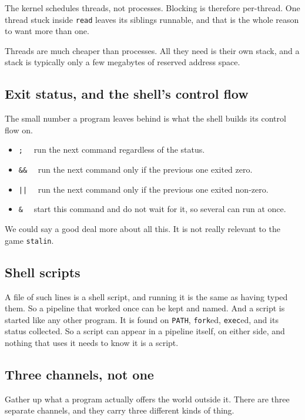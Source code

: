 \documentclass[11pt,a4paper]{article}
\begin{document}
The kernel schedules threads, not processes. Blocking is therefore per-thread. One thread stuck
inside \texttt{read} leaves its siblings runnable, and that is the whole reason to want more than
one.

Threads are much cheaper than processes. All they need is their own stack, and a stack is
typically only a few megabytes of reserved address space.


\subsection{Exit status, and the shell's control flow}

The small number a program leaves behind is what the shell builds its control flow on.

\begin{itemize}
\item \texttt{;} \ \ run the next command regardless of the status.
\item \texttt{\&\&} \ \ run the next command only if the previous one exited zero.
\item \texttt{||} \ \ run the next command only if the previous one exited non-zero.
\item \texttt{\&} \ \ start this command and do not wait for it, so several can run at once.
\end{itemize}

We could say a good deal more about all this. It is not really relevant to the game
\texttt{stalin}.

\subsection{Shell scripts}

A file of such lines is a shell script, and running it is the same as having typed them. So a
pipeline that worked once can be kept and named. And a script is started like any other program. It
is found on \texttt{PATH}, \texttt{fork}ed, \texttt{exec}ed, and its status collected. So a script
can appear in a pipeline itself, on either side, and nothing that uses it needs to know it is a
script.

\subsection{Three channels, not one}

Gather up what a program actually offers the world outside it. There are three separate
channels, and they carry three different kinds of thing.
\end{document}

